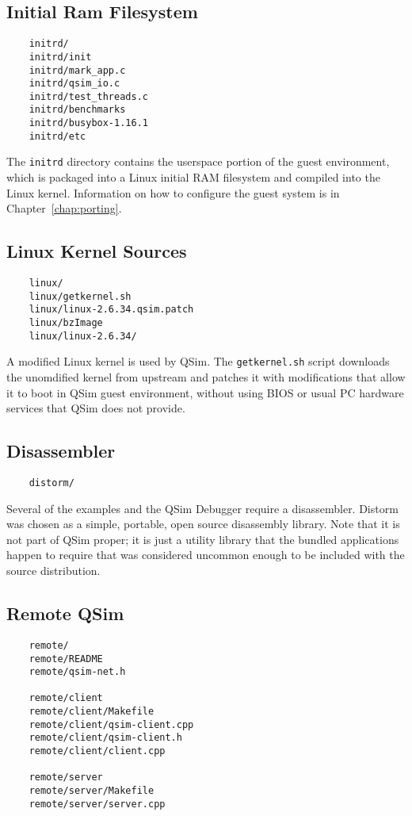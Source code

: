 \documentclass[letterpaper, 10pt]{book}
\begin{document}
\subsection{Initial Ram Filesystem}
\begin{verbatim}
    initrd/
    initrd/init
    initrd/mark_app.c
    initrd/qsim_io.c
    initrd/test_threads.c
    initrd/benchmarks
    initrd/busybox-1.16.1
    initrd/etc
\end{verbatim}
The \texttt{initrd} directory contains the userspace portion of the guest
environment, which is packaged into a Linux initial RAM filesystem and compiled
into the Linux kernel. Information on how to configure the guest system is in
Chapter~\ref{chap:porting}.

\subsection{Linux Kernel Sources}
\begin{verbatim}
    linux/
    linux/getkernel.sh
    linux/linux-2.6.34.qsim.patch
    linux/bzImage
    linux/linux-2.6.34/
\end{verbatim}
A modified Linux kernel is used by QSim. The \texttt{getkernel.sh} script
downloads the unomdified kernel from upstream and patches it with modifications
that allow it to boot in QSim guest environment, without using BIOS or usual PC
hardware services that QSim does not provide.

\subsection{Disassembler}
\begin{verbatim}
    distorm/
\end{verbatim}
Several of the examples and the QSim Debugger require a disassembler. Distorm 
was chosen as a simple, portable, open source disassembly library. Note that it
is not part of QSim proper; it is just a utility library that the bundled
applications happen to require that was considered uncommon enough to be
included with the source distribution.

\subsection{Remote QSim}
\begin{verbatim}
    remote/
    remote/README
    remote/qsim-net.h

    remote/client
    remote/client/Makefile
    remote/client/qsim-client.cpp
    remote/client/qsim-client.h
    remote/client/client.cpp

    remote/server
    remote/server/Makefile
    remote/server/server.cpp
\end{verbatim}
\end{document}
